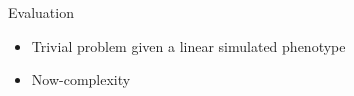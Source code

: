 \documentclass{beamer}
\begin{document}
\begin{frame}[t]{Evaluation}
  \begin{itemize}
    \item Trivial problem given a linear simulated phenotype
    \item Now-complexity
  \end{itemize}
\end{frame}

% 
% 
% 
\end{document}
